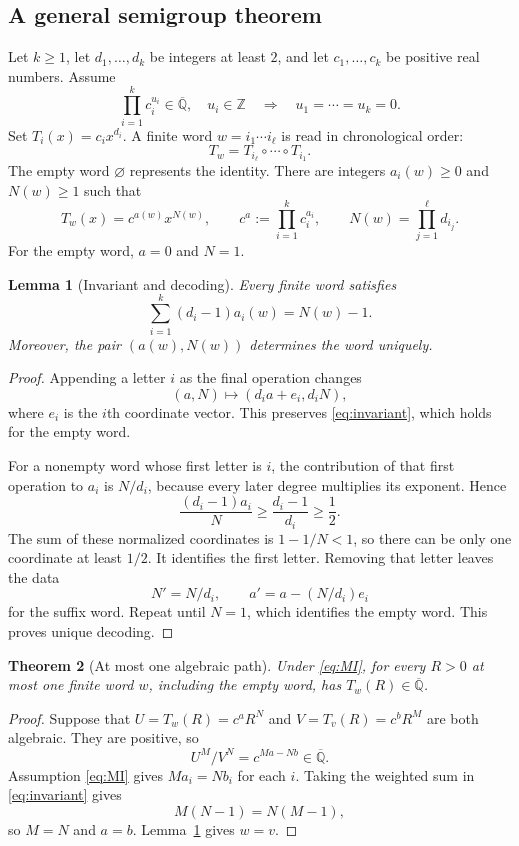 \documentclass[11pt,a4paper]{article}
\numberwithin{equation}{section}
\newtheorem{theorem}{Theorem}[section]
\newtheorem{lemma}[theorem]{Lemma}
\theoremstyle{definition}
\theoremstyle{remark}
\newcommand{\Qbar}{\overline{\mathbb Q}}
\begin{document}
\subsection{A general semigroup theorem}

Let $k\geq1$, let $d_1,\ldots,d_k$ be integers at least $2$, and let $c_1,\ldots,c_k$ be positive real numbers. Assume
\begin{equation}\label{eq:MI}
 \prod_{i=1}^k c_i^{u_i}\in\Qbar,\quad u_i\in\mathbb Z
 \quad\Longrightarrow\quad u_1=\cdots=u_k=0.
\end{equation}
Set $T_i(x)=c_i x^{d_i}$. A finite word $w=i_1\cdots i_\ell$ is read in chronological order:
\[
 T_w=T_{i_\ell}\circ\cdots\circ T_{i_1}.
\]
The empty word $\varnothing$ represents the identity. There are integers $a_i(w)\geq0$ and $N(w)\geq1$ such that
\begin{equation}\label{eq:word-form}
 T_w(x)=c^{a(w)}x^{N(w)},\qquad
 c^a:=\prod_{i=1}^k c_i^{a_i},\qquad
 N(w)=\prod_{j=1}^{\ell}d_{i_j}.
\end{equation}
For the empty word, $a=0$ and $N=1$.

\begin{lemma}[Invariant and decoding]\label{lem:encoding}
Every finite word satisfies
\begin{equation}\label{eq:invariant}
 \sum_{i=1}^k(d_i-1)a_i(w)=N(w)-1.
\end{equation}
Moreover, the pair $(a(w),N(w))$ determines the word uniquely.
\end{lemma}
\begin{proof}
Appending a letter $i$ as the final operation changes
\[
 (a,N)\longmapsto(d_i a+e_i,d_iN),
\]
where $e_i$ is the $i$th coordinate vector. This preserves \eqref{eq:invariant}, which holds for the empty word.

For a nonempty word whose first letter is $i$, the contribution of that first operation to $a_i$ is $N/d_i$, because every later degree multiplies its exponent. Hence
\[
 \frac{(d_i-1)a_i}{N}\geq\frac{d_i-1}{d_i}\geq\frac12.
\]
The sum of these normalized coordinates is $1-1/N<1$, so there can be only one coordinate at least $1/2$. It identifies the first letter. Removing that letter leaves the data
\[
 N'=N/d_i,\qquad a'=a-(N/d_i)e_i
\]
for the suffix word. Repeat until $N=1$, which identifies the empty word. This proves unique decoding.
\end{proof}

\begin{theorem}[At most one algebraic path]\label{thm:one-path}
Under \eqref{eq:MI}, for every $R>0$ at most one finite word $w$, including the empty word, has $T_w(R)\in\Qbar$.
\end{theorem}
\begin{proof}
Suppose that $U=T_w(R)=c^aR^N$ and $V=T_v(R)=c^bR^M$ are both algebraic. They are positive, so
\[
 U^M/V^N=c^{Ma-Nb}\in\Qbar.
\]
Assumption \eqref{eq:MI} gives $Ma_i=Nb_i$ for each $i$. Taking the weighted sum in \eqref{eq:invariant} gives
\[
 M(N-1)=N(M-1),
\]
so $M=N$ and $a=b$. Lemma~\ref{lem:encoding} gives $w=v$.
\end{proof}
\end{document}
